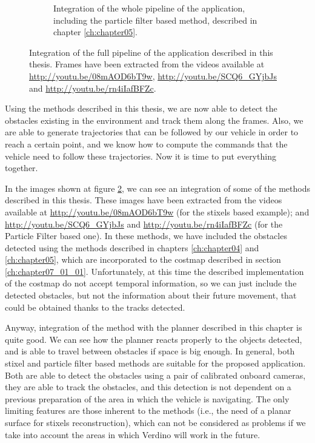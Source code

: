\begin{figure}[p]
\begin{subfigure}[b]{\textwidth}
    \caption{Integration of the whole pipeline of the application, including the particle filter based method, described in chapter \ref{ch:chapter05}.}\label{fig:cp07_particle_filter_whole_pipeline}
  \end{subfigure}
  \caption{Integration of the full pipeline of the application described in this thesis. Frames have been extracted from the videos available at \url{http://youtu.be/08mAOD6bT9w}, \url{http://youtu.be/SCQ6_GYjbJs} and \url{http://youtu.be/rn4iIafBFZc}.}\label{fig:cp07_whole_pipeline}
\end{figure}

Using the methods described in this thesis, we are now able to detect the obstacles existing in the environment and track them along the frames. Also, we are able to generate trajectories that can be followed by our vehicle in order to reach a certain point, and we know how to compute the commands that the vehicle need to follow these trajectories. Now it is time to put everything together.

In the images shown at figure \ref{fig:cp07_whole_pipeline}, we can see an integration of some of the methods described in this thesis. These images have been extracted from the videos available at \url{http://youtu.be/08mAOD6bT9w} (for the stixels based example); and \url{http://youtu.be/SCQ6_GYjbJs} and \url{http://youtu.be/rn4iIafBFZc} (for the Particle Filter based one). In these methods, we have included the obstacles detected using the methods described in chapters \ref{ch:chapter04} and \ref{ch:chapter05}, which are incorporated to the costmap described in section \ref{ch:chapter07_01_01}. Unfortunately, at this time the described implementation of the costmap do not accept temporal information, so we can just include the detected obstacles, but not the information about their future movement, that could be obtained thanks to the tracks detected.

Anyway, integration of the method with the planner described in this chapter is quite good. We can see how the planner reacts properly to the objects detected, and is able to travel between obstacles if space is big enough. In general, both stixel and particle filter based methods are suitable for the proposed application. Both are able to detect the obstacles using a pair of calibrated onboard cameras, they are able to track the obstacles, and this detection is not dependent on a previous preparation of the area in which the vehicle is navigating. The only limiting features are those inherent to the methods (i.e., the need of a planar surface for stixels reconstruction), which can not be considered as problems if we take into account the areas in which Verdino will work in the future.

\FloatBarrier